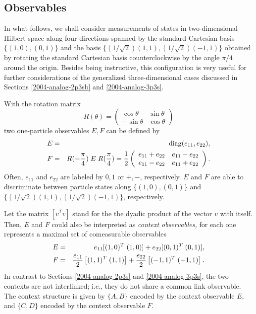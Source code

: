 \documentclass[12pt]{iopart}
\begin{document}
\subsection{Observables}

In what follows, we shall consider measurements of states in two-dimensional Hilbert space
along four directions spanned by the standard Cartesian basis $\{(1,0),(0,1)\}$
and the basis
$\{(1/\sqrt{2})(1,1),(1/\sqrt{2})(-1,1)\}$
obtained by rotating the standard Cartesian basis counterclockwise by the angle $\pi /4$ around the origin.
Besides being instructive, this configuration is very useful for further considerations
of the generalized three-dimensional cases discussed in Sections
\ref{2004-analog-2p3sb}
and
\ref{2004-analog-3p3s}.

With the rotation matrix
\begin{equation}
R(\theta ) =
\left(
\begin{array}{cccc}
\cos \theta &\sin \theta \\
-\sin \theta &\cos \theta
\end{array}
\right)
\end{equation}
two one-particle observables $E,F$ can be defined by
\begin{eqnarray}
E &=&
{\rm diag}(e_{11},e_{22}),
\label{2004-analog-Epiover4}
\\
F &=& R(-{\pi \over 4})\; E \; R({\pi \over 4})
=
{1\over {2}}\left(
\begin{array}{cccc}
e_{11}+e_{22}&e_{11}-e_{22}\\
e_{11}-e_{22}&e_{11}+e_{22}
\end{array}
\right) .
\label{2004-analog-Epiover4b}
\end{eqnarray}
Often,
$e_{11}$
and
$e_{22}$
are  labeled by $0,1$ or $+,-$, respectively.
$E$ and $F$ are able to discriminate between particle states along
$\{(1,0),(0,1)\}$
and
$\{(1/\sqrt{2})(1,1),(1/\sqrt{2})(-1,1)\}$,
respectively.

Let
the matrix $[{ v}^T{ v}]$
stand for the the dyadic product
of the vector ${ v}$ with itself.
Then,
$E$ and $F$ could also be interpreted as {\em context observables,}
for each one represents a maximal set of comeasurable observables
\begin{eqnarray}
E &=&  e_{11}[(1,0)^T\;(1,0)] + e_{22}[(0,1)^T\;(0,1)],
\label{2004-analog-Epiover4c}
\\
F &=&  {e_{11}\over 2}\left[(1,1)^T\; (1,1)\right]
+ {e_{22}\over 2}\left[(-1,1)^T\;(-1,1)\right] .
\label{2004-analog-Epiover4bc}
\end{eqnarray}
In contrast to Sections
\ref{2004-analog-2p3s}
and
\ref{2004-analog-3p3s},
the two contexts are not interlinked;
i.e.,
they do not share a common link observable.
The context structure is given by $\{A,B\}$ encoded by the context observable $E$,
and $\{C,D\}$ encoded by the context observable $F$.
\end{document}
